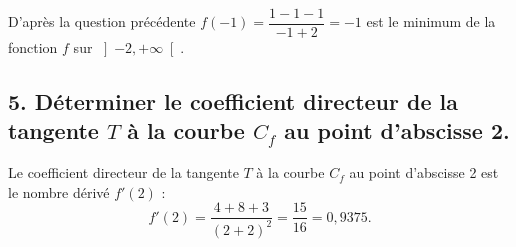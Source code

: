 	D’après la question précédente \(f(-1) = \dfrac{1 - 1 - 1}{-1 + 2} = -1\) est le minimum de la fonction \(f\) sur \(\left] -2, +\infty \right[\).
	
	\subsection*{5. Déterminer le coefficient directeur de la tangente \(T\) à la courbe \(C_f\) au point d’abscisse 2.}
	
	Le coefficient directeur de la tangente \(T\) à la courbe \(C_f\) au point d’abscisse 2 est le nombre dérivé \(f'(2)\) :
	\[ f'(2) = \dfrac{4 + 8 + 3}{(2 + 2)^2} = \dfrac{15}{16} = 0,9375. \]
